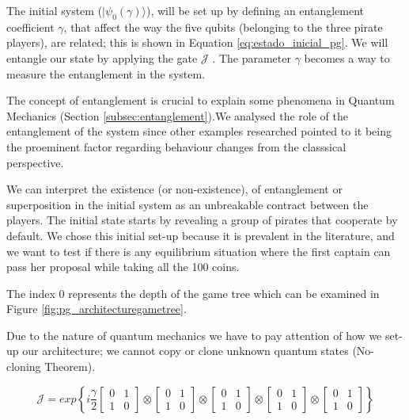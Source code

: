 The initial system ($\vert \psi_{0}(\gamma) \rangle$), will be set up by defining an entanglement coefficient $\gamma$, that affect the way the five qubits (belonging to the three pirate players), are related; this is shown in Equation \ref{eq:estado_inicial_pg}. 
We will entangle our state by applying the gate $\mathcal{J}$ \cite{Letters2002}. The parameter $\gamma$ becomes a way to measure the entanglement in the system\cite{Eisert2008}. 

The concept of entanglement is crucial to explain some phenomena in Quantum Mechanics (Section \ref{subsec:entanglement}).We analysed the role of the entanglement of the system since other examples researched pointed to it being the proeminent factor regarding behaviour changes from the classsical perspective\cite{Fra2011a}\cite{Fra2011}\cite{Letters2002}\cite{Khan2011}\cite{Ricketts2006}. 

We can interpret the existence (or non-existence), of entanglement or superposition in the initial system as an unbreakable contract between the players\cite{Piotrowski}. The initial state starts by revealing a group of pirates that cooperate by default. We chose this initial set-up because it is prevalent in the literature\cite{Eisert2008}\cite{Fra2011a}\cite{Fra2011}\cite{Letters2002}, and we want to test if there is any equilibrium situation where the first captain can pass her proposal while taking all the 100 coins. 


The index $0$ represents the depth of the game tree which can be examined in Figure \ref{fig:pg_architecturegametree}.

Due to the nature of quantum mechanics we have to pay attention of how we set-up our architecture; we cannot copy or clone unknown quantum states (No-cloning Theorem)\cite{Rieffel2011}. 



\begin{equation}
\mathcal{J}=exp\left\{ i\frac{\gamma}{2}\left[\begin{array}{cc}
0 & 1\\
1 & 0
\end{array}\right]\otimes\left[\begin{array}{cc}
0 & 1\\
1 & 0
\end{array}\right]\otimes\left[\begin{array}{cc}
0 & 1\\
1 & 0
\end{array}\right]\otimes\left[\begin{array}{cc}
0 & 1\\
1 & 0
\end{array}\right]
\otimes\left[\begin{array}{cc}
0 & 1\\
1 & 0
\end{array}\right]
\right\}
\label{eq:matrix_exponencial_esoterica}
\end{equation} 

